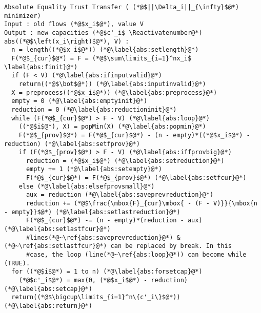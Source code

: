 \Suppressnumber
\begin{lstlisting}[label=abs, style=numbers]
Absolute Equality Trust Transfer ( (*@$||\Delta_i||_{\infty}$@*) minimizer)
Input : old flows (*@$x_i$@*), value V
Output : new capacities (*@$c'_i$ \Reactivatenumber@*)
abs((*@$\left(x_i\right)$@*), V) :
  n = length((*@$x_i$@*)) (*@\label{abs:setlength}@*)
  F(*@$_{cur}$@*) = F = (*@$\sum\limits_{i=1}^nx_i$ \label{abs:finit}@*)
  if (F < V) (*@\label{abs:ifinputvalid}@*)
    return((*@$\bot$@*)) (*@\label{abs:inputinvalid}@*)
  X = preprocess((*@$x_i$@*)) (*@\label{abs:preprocess}@*)
  empty = 0 (*@\label{abs:emptyinit}@*)
  reduction = 0 (*@\label{abs:reductioninit}@*)
  while (F(*@$_{cur}$@*) > F - V) (*@\label{abs:loop}@*)
    ((*@$i$@*), X) = popMin(X) (*@\label{abs:popmin}@*)
    F(*@$_{prov}$@*) = F(*@$_{cur}$@*) - (n - empty)*((*@$x_i$@*) - reduction) (*@\label{abs:setfprov}@*)
    if (F(*@$_{prov}$@*) > F - V) (*@\label{abs:iffprovbig}@*)
      reduction = (*@$x_i$@*) (*@\label{abs:setreduction}@*)
      empty += 1 (*@\label{abs:setempty}@*)
      F(*@$_{cur}$@*) = F(*@$_{prov}$@*) (*@\label{abs:setfcur}@*)
    else (*@\label{abs:elsefprovsmall}@*)
      aux = reduction (*@\label{abs:saveprevreduction}@*)
      reduction += (*@$\frac{\mbox{F}_{cur}\mbox{ - (F - V)}}{\mbox{n - empty}}$@*) (*@\label{abs:setlastreduction}@*)
      F(*@$_{cur}$@*) -= (n - empty)*(reduction - aux) (*@\label{abs:setlastfcur}@*)
      #lines(*@~\ref{abs:saveprevreduction}@*) &(*@~\ref{abs:setlastfcur}@*) can be replaced by break. In this
      #case, the loop (line(*@~\ref{abs:loop}@*)) can become while (TRUE).
  for ((*@$i$@*) = 1 to n) (*@\label{abs:forsetcap}@*)
    (*@$c'_i$@*) = max(0, (*@$x_i$@*) - reduction) (*@\label{abs:setcap}@*)
  return((*@$\bigcup\limits_{i=1}^n\{c'_i\}$@*)) (*@\label{abs:return}@*)
\end{lstlisting}
